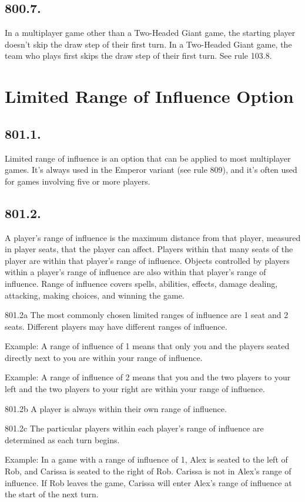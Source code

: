 \subsection*{800.7.}
In a multiplayer game other than a Two-Headed Giant game, the starting player doesn’t skip the draw step of their first turn. In a Two-Headed Giant game, the team who plays first skips the draw step of their first turn. See rule 103.8.

\section{Limited Range of Influence Option}
\subsection*{801.1.}
Limited range of influence is an option that can be applied to most multiplayer games. It’s always used in the Emperor variant (see rule 809), and it’s often used for games involving five or more players.

\subsection*{801.2.}
A player’s range of influence is the maximum distance from that player, measured in player seats, that the player can affect. Players within that many seats of the player are within that player’s range of influence. Objects controlled by players within a player’s range of influence are also within that player’s range of influence. Range of influence covers spells, abilities, effects, damage dealing, attacking, making choices, and winning the game.

801.2a The most commonly chosen limited ranges of influence are 1 seat and 2 seats. Different players may have different ranges of influence.

Example: A range of influence of 1 means that only you and the players seated directly next to you are within your range of influence.

Example: A range of influence of 2 means that you and the two players to your left and the two players to your right are within your range of influence.

801.2b A player is always within their own range of influence.

801.2c The particular players within each player’s range of influence are determined as each turn begins.

Example: In a game with a range of influence of 1, Alex is seated to the left of Rob, and Carissa is seated to the right of Rob. Carissa is not in Alex’s range of influence. If Rob leaves the game, Carissa will enter Alex’s range of influence at the start of the next turn.

